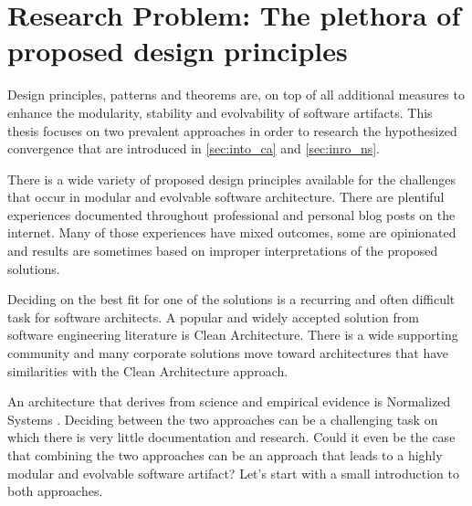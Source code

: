 \section{Research Problem: The plethora of proposed design principles}
\label{sec:research_problem}

Design principles, patterns and theorems are, on top of all additional measures to enhance
the modularity, stability and evolvability of software artifacts. This thesis focuses on
two prevalent approaches in order to research the hypothesized convergence that are
introduced in \ref{sec:into_ca} and \ref{sec:inro_ns}. 

There is a wide variety of proposed design principles available for the challenges that
occur in modular and evolvable software architecture. There are plentiful experiences
documented throughout professional and personal blog posts on the internet. Many of those
experiences have mixed outcomes, some are opinionated and results are sometimes based on
improper interpretations of the proposed solutions.

Deciding on the best fit for one of the solutions is a recurring and often difficult task
for software architects. A popular and widely accepted solution from software engineering
literature is Clean Architecture. There is a wide supporting community and many corporate
solutions move toward architectures that have similarities with the Clean Architecture
approach. 

An architecture that derives from science and empirical evidence is Normalized Systems
\parencite{mannaert_normalized_2009,mannaert_normalized_2016}. Deciding between the two
approaches can be a challenging task on which there is very little documentation and
research. Could it even be the case that combining the two approaches can be an approach
that leads to a highly modular and evolvable software artifact? Let's start with a small
introduction to both approaches.